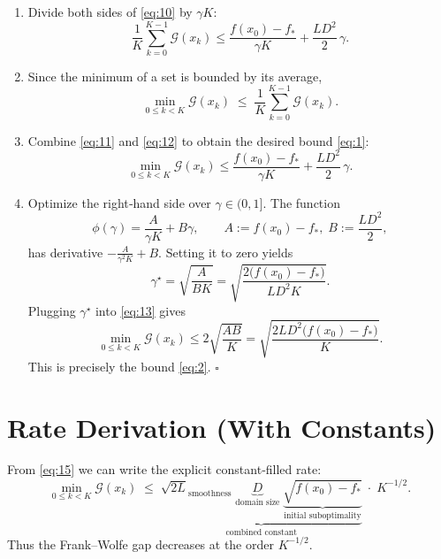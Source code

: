 \documentclass{article}
\newcommand{\gap}{\mathcal{G}}
\newcommand{\diam}{D}
\begin{document}
\begin{enumerate}
\item[Step 9.] Divide both sides of \eqref{eq:10} by $\gamma K$:
\[
\frac{1}{K}\sum_{k=0}^{K-1}\gap(x_k)
   \le \frac{f(x_0)-f_*}{\gamma K}
      +\frac{L\diam^2}{2}\,\gamma .
\tag{11}
\]

\item[Step 10.] Since the minimum of a set is bounded by its average,
\[
\min_{0\le k<K}\gap(x_k)\;\le\;\frac{1}{K}\sum_{k=0}^{K-1}\gap(x_k) .
\tag{12}
\]

\item[Step 11.] Combine \eqref{eq:11} and \eqref{eq:12} to obtain the desired bound \eqref{eq:1}:
\[
\boxed{\displaystyle
\min_{0\le k<K}\gap(x_k)\le
\frac{f(x_0)-f_*}{\gamma K}
+\frac{L\diam^2}{2}\,\gamma } .
\tag{13}
\]

\item[Step 12.] Optimize the right‑hand side over $\gamma\in(0,1]$.  The function
\[
\phi(\gamma)=\frac{A}{\gamma K}+B\gamma,\qquad 
A:=f(x_0)-f_*,\; B:=\frac{L\diam^2}{2},
\]
has derivative $-\frac{A}{\gamma^2 K}+B$.
Setting it to zero yields
\[
\gamma^\star=\sqrt{\frac{A}{BK}}=\sqrt{\frac{2\bigl(f(x_0)-f_*\bigr)}{L\diam^2 K}} .
\tag{14}
\]
Plugging $\gamma^\star$ into \eqref{eq:13} gives
\[
\min_{0\le k<K}\gap(x_k)\le
2\sqrt{\frac{AB}{K}}=
\sqrt{\frac{2L\diam^2\bigl(f(x_0)-f_*\bigr)}{K}} .
\tag{15}
\]
This is precisely the bound \eqref{eq:2}.  \hfill $\square$
\end{enumerate}

\section*{Rate Derivation (With Constants)}
From \eqref{eq:15} we can write the explicit constant‑filled rate:
\[
\boxed{
\min_{0\le k<K}\gap(x_k)\;\le\;
\underbrace{\sqrt{2L}_{\text{smoothness}}
\;\underbrace{\diam}_{\text{domain size}}
\;\underbrace{\sqrt{f(x_0)-f_*}}_{\text{initial suboptimality}}}_{\text{combined constant}}
\;\cdot\;K^{-1/2}} .
\]
Thus the Frank–Wolfe gap decreases at the order $K^{-1/2}$.
\end{document}
